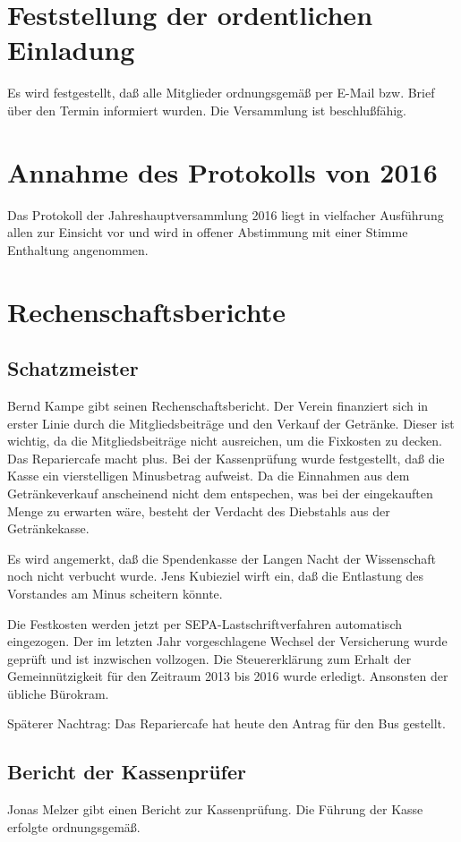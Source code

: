 \documentclass[]{scrartcl}
\newcommand{\qbi}{Jens Kubieziel}
\newcommand{\berndf}{Bernd Kampe}
\newcommand{\joe}{Jonas Melzer}
\begin{document}
\begin{multicols}{2}
\section{Feststellung der ordentlichen Einladung}
Es wird festgestellt, daß alle Mitglieder ordnungsgemäß per E-Mail bzw.
Brief über den Termin informiert wurden. Die Versammlung ist beschlußfähig.

\section{Annahme des Protokolls von 2016}
Das Protokoll der Jahreshauptversammlung 2016 liegt in vielfacher Ausführung
allen zur Einsicht vor und wird in offener Abstimmung mit einer Stimme
Enthaltung angenommen.

\section{Rechenschaftsberichte}
\subsection{Schatzmeister}
\berndf{} gibt seinen Rechenschaftsbericht. Der Verein finanziert
sich in erster Linie durch die Mitgliedsbeiträge und den Verkauf der
Getränke. Dieser ist wichtig, da die Mitgliedsbeiträge nicht ausreichen, um
die Fixkosten zu decken. Das Repariercafe macht plus. Bei der Kassenprüfung
wurde festgestellt, daß die Kasse ein vierstelligen Minusbetrag aufweist. Da
die Einnahmen aus dem Getränkeverkauf anscheinend nicht dem entspechen, was
bei der eingekauften Menge zu erwarten wäre, besteht der Verdacht des
Diebstahls aus der Getränkekasse.

Es wird angemerkt, daß die Spendenkasse der Langen Nacht der Wissenschaft
noch nicht verbucht wurde. \qbi{} wirft ein, daß die Entlastung des Vorstandes
am Minus scheitern könnte.

Die Festkosten werden jetzt per SEPA-Lastschriftverfahren automatisch
eingezogen. Der im letzten Jahr vorgeschlagene Wechsel der Versicherung
wurde geprüft und ist inzwischen vollzogen. Die Steuererklärung zum Erhalt
der Gemeinnützigkeit für den Zeitraum 2013 bis 2016 wurde erledigt.
Ansonsten der übliche Bürokram.
    
Späterer Nachtrag: Das Repariercafe hat heute den Antrag für den Bus
gestellt.

\subsection{Bericht der Kassenprüfer}
\joe{} gibt einen Bericht zur Kassenprüfung. Die Führung der Kasse  erfolgte
ordnungsgemäß.


\end{multicols}
\end{document}
